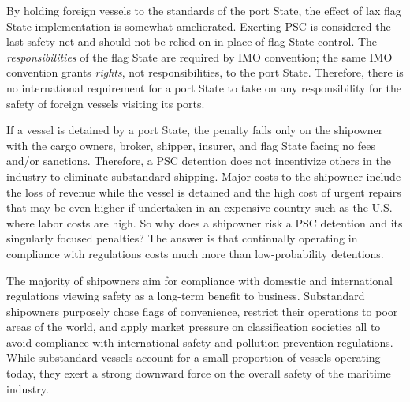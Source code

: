 \documentclass[twoside,symmetric,notoc]{tufte-book}
\begin{document}
\par{%
By holding foreign vessels to the standards of the port State, the effect of lax flag State implementation is somewhat ameliorated. Exerting PSC is considered the last safety net and should not be relied on in place of flag State control. The \textit{responsibilities} of the flag State are required by IMO convention; the same IMO convention grants \textit{rights}, not responsibilities, to the port State. Therefore, there is no international requirement for a port State to take on any responsibility for the safety of foreign vessels visiting its ports.\cite{Konig}
}
\par{%
If a vessel is detained by a port State, the penalty falls only on the shipowner with the cargo owners, broker, shipper, insurer, and flag State facing no fees and/or sanctions. Therefore, a PSC detention does not incentivize others in the industry to eliminate substandard shipping.\cite{SSY} Major costs to the shipowner include the loss of revenue while the vessel is detained and the high cost of urgent repairs that may be even higher if undertaken in an expensive country such as the U.S. where labor costs are high.\cite{Rajadurai} So why does a shipowner risk a PSC detention and its singularly focused penalties? The answer is that continually operating in compliance with regulations costs much more than low-probability detentions.\cite{OECD_2002}
}
\par{%
The majority of shipowners aim for compliance with domestic and international regulations viewing safety as a long-term benefit to business. Substandard shipowners purposely chose flags of convenience, restrict their operations to poor areas of the world, and apply market pressure on classification societies all to avoid compliance with international safety and pollution prevention regulations. While substandard vessels account for a small proportion of vessels operating today, they exert a strong downward force on the overall safety of the maritime industry.\cite{Boisson}
}
\end{document}
